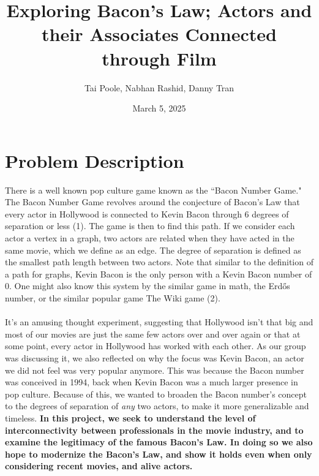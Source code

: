 \documentclass{article}
\title{Exploring Bacon's Law; Actors and their Associates Connected through Film}
\author{Tai Poole, Nabhan Rashid, Danny Tran}
\date{March 5, 2025}
\begin{document}
\maketitle

\section{Problem Description}
There is a well known pop culture game known as the ``Bacon Number Game." The Bacon Number Game revolves around the conjecture of Bacon’s Law that every actor in Hollywood is connected to Kevin Bacon through 6 degrees of separation or less (1). The game is then to find this path. If we consider each actor a vertex in a graph, two actors are related when they have acted in the same movie, which we define as an edge. The degree of separation is defined as the smallest path length between two actors. Note that similar to the definition of a path for graphs, Kevin Bacon is the only person with a Kevin Bacon number of 0. One might also know this system by the similar game in math, the Erdős number, or the similar popular game The Wiki game (2). \\\\
It’s an amusing thought experiment, suggesting that Hollywood isn’t that big and most of our movies are just the same few actors over and over again or that at some point, every actor in Hollywood has worked with each other. As our group was discussing it, we also reflected on why the focus was Kevin Bacon, an actor we did not feel was very popular anymore. This was because the Bacon number was conceived in 1994, back when Kevin Bacon was a much larger presence in pop culture. Because of this, we wanted to broaden the Bacon number's concept to the degrees of separation of \emph{any} two actors, to make it more generalizable and timeless. \textbf{In this project, we seek to understand the level of interconnectivity between professionals in the movie industry, and to examine the legitimacy of the famous Bacon’s Law. In doing so we also hope to modernize the Bacon's Law, and show it holds even when only considering recent movies, and alive actors.}
\end{document}
